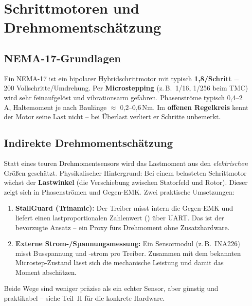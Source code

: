 
\chapter{Schrittmotoren und Drehmomentschätzung}

\section{NEMA-17-Grundlagen}
Ein NEMA-17 ist ein bipolarer Hybridschrittmotor mit typisch
\textbf{1{,}8\textdegree/Schritt} = 200 Vollschritte/Umdrehung. Per
\textbf{Microstepping} (z.\,B.\ 1/16, 1/256 beim TMC) wird sehr feinaufgelöst
und vibrationsarm gefahren. Phasenströme typisch 0{,}4--2\,A, Haltemoment je
nach Baulänge $\approx$ 0{,}2--0{,}6\,Nm. Im \textbf{offenen Regelkreis} kennt
der Motor seine Last nicht -- bei Überlast verliert er Schritte unbemerkt.

\section{Indirekte Drehmomentschätzung}
Statt eines teuren Drehmomentsensors wird das Lastmoment aus den
\emph{elektrischen} Größen geschätzt. Physikalischer Hintergrund: Bei einem
belasteten Schrittmotor wächst der \textbf{Lastwinkel} (die Verschiebung
zwischen Statorfeld und Rotor). Dieser zeigt sich in Phasenströmen und
Gegen-EMK. Zwei praktische Umsetzungen:
\begin{enumerate}
\item \textbf{StallGuard (Trinamic):} Der Treiber misst intern die Gegen-EMK und
  liefert einen lastproportionalen Zahlenwert () über UART.
  Das ist der bevorzugte Ansatz -- ein Proxy fürs Drehmoment ohne
  Zusatzhardware.
\item \textbf{Externe Strom-/Spannungsmessung:} Ein Sensormodul (z.\,B.\
  INA226) misst Busspannung und -strom pro Treiber. Zusammen mit dem bekannten
  Microstep-Zustand lässt sich die mechanische Leistung und damit das Moment
  abschätzen.
\end{enumerate}
Beide Wege sind weniger präzise als ein echter Sensor, aber günstig und
praktikabel -- siehe Teil~II für die konkrete Hardware.
